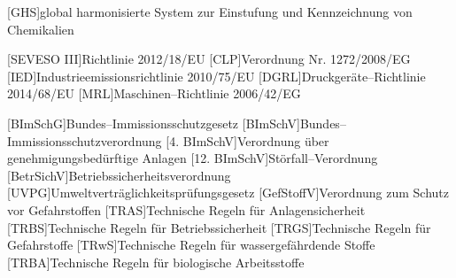 \begin{acronym}[12. BImSchV]
	[GHS]{global harmonisierte System zur Einstufung und Kennzeichnung von Chemikalien}
		
	[SEVESO III]{Richtlinie 2012/18/EU}
	[CLP]{Verordnung Nr. 1272/2008/EG}
	[IED]{Industrieemissionsrichtlinie 2010/75/EU}
	[DGRL]{Druckger\"ate--Richtlinie 2014/68/EU}
	[MRL]{Maschinen--Richtlinie 2006/42/EG}
	
	[BImSchG]{Bundes--Immissionsschutzgesetz}
	[BImSchV]{Bundes--Immissionsschutzverordnung}
  [4. BImSchV]{Verordnung \"uber genehmigungsbed\"urftige Anlagen}
	[12. BImSchV]{St\"orfall--Verordnung}
	[BetrSichV]{Betriebssicherheitsverordnung}
	[UVPG]{Umweltvertr\"aglichkeitspr\"ufungsgesetz}
	[GefStoffV]{Verordnung zum Schutz vor Gefahrstoffen}
	[TRAS]{Technische Regeln f\"ur Anlagensicherheit}
	[TRBS]{Technische Regeln f\"ur Betriebssicherheit}
	[TRGS]{Technische Regeln f\"ur Gefahrstoffe}
	[TRwS]{Technische Regeln f\"ur wassergef\"ahrdende Stoffe}
	[TRBA]{Technische Regeln f\"ur biologische Arbeitsstoffe}
\end{acronym}